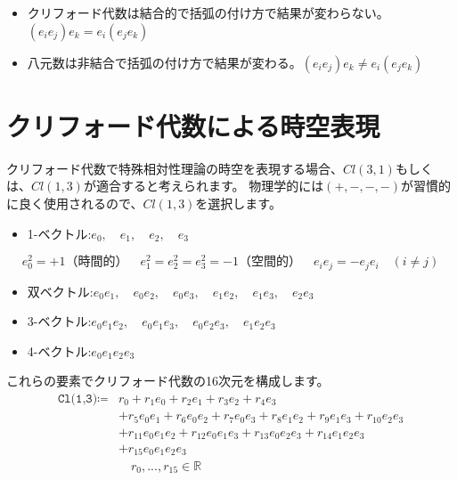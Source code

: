 \documentclass[a4paper,12pt,notitlepage]{jsreport}
\begin{document}
\begin{itemize}
  \item クリフォード代数は結合的で括弧の付け方で結果が変わらない。$(e_ie_j)e_k = e_i(e_je_k)$
  \item 八元数は非結合で括弧の付け方で結果が変わる。$(e_ie_j)e_k \neq e_i(e_je_k)$
\end{itemize}

\section{クリフォード代数による時空表現}

クリフォード代数で特殊相対性理論の時空を表現する場合、$Cl(3,1)$もしくは、$Cl(1,3)$が適合すると考えられます。
物理学的には$(+,-,-,-)$が習慣的に良く使用されるので、$Cl(1,3)$を選択します。

\begin{itemize}
  \item 1-ベクトル:\quad $e_0,\quad e_1,\quad e_2,\quad e_3$
\end{itemize}

\begin{equation}
  e_0^2=+1（時間的）\quad e_1^2=e_2^2=e_3^2=-1（空間的）\quad e_ie_j=-e_je_i\quad (i\neq j)
\end{equation}

\begin{itemize}
  \item 双ベクトル:\quad $e_0e_1,\quad e_0e_2,\quad e_0e_3,\quad e_1e_2,\quad e_1e_3,\quad e_2e_3$
  \item 3-ベクトル:\quad $e_0e_1e_2,\quad e_0e_1e_3,\quad e_0e_2e_3,\quad e_1e_2e_3$
  \item 4-ベクトル:\quad $e_0e_1e_2e_3$
\end{itemize}

これらの要素でクリフォード代数の16次元を構成します。
\begin{equation}
  \begin{split}
    \texttt{Cl(1,3)}\coloneq &r_0+r_1e_0+r_2e_1+r_3e_2+r_4e_3\\
    &+r_5e_0e_1+r_6e_0e_2+r_7e_0e_3+r_8e_1e_2+r_9e_1e_3+r_{10}e_2e_3\\
    &+r_{11}e_0e_1e_2+r_{12}e_0e_1e_3+r_{13}e_0e_2e_3+r_{14}e_1e_2e_3\\
    &+r_{15}e_0e_1e_2e_3\\
    &\quad r_0,...,r_{15}\in\mathbb{R}
  \end{split}
\end{equation}
\end{document}
